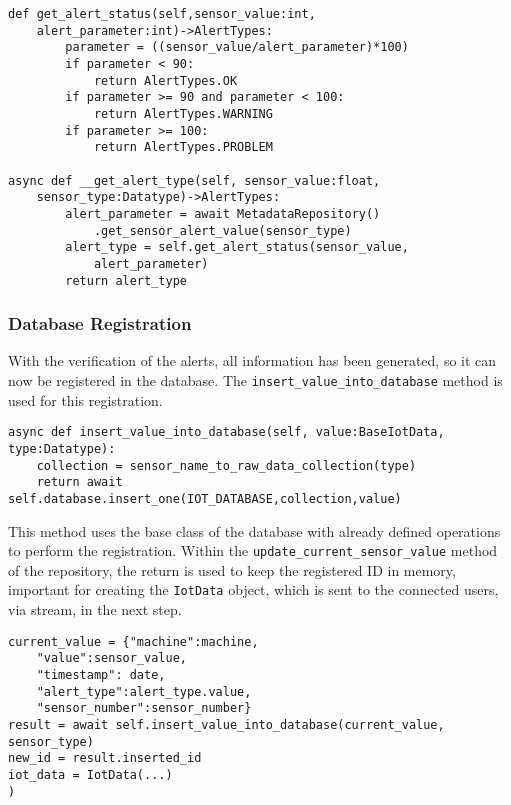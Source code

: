 \begin{Verbatim}[fontsize=\small, baselinestretch=0.8]
def get_alert_status(self,sensor_value:int,
    alert_parameter:int)->AlertTypes:
        parameter = ((sensor_value/alert_parameter)*100)
        if parameter < 90:
            return AlertTypes.OK
        if parameter >= 90 and parameter < 100:
            return AlertTypes.WARNING
        if parameter >= 100:
            return AlertTypes.PROBLEM

async def __get_alert_type(self, sensor_value:float,
    sensor_type:Datatype)->AlertTypes:
        alert_parameter = await MetadataRepository()
            .get_sensor_alert_value(sensor_type)
        alert_type = self.get_alert_status(sensor_value,
            alert_parameter)
        return alert_type
\end{Verbatim}

\subsubsection{Database Registration}

With the verification of the alerts, all information has been generated, so it can now be registered in the database. The \texttt{insert\_value\_into\_database} method is used for this registration.

\begin{Verbatim}[fontsize=\small, baselinestretch=0.8]
async def insert_value_into_database(self, value:BaseIotData, type:Datatype):
    collection = sensor_name_to_raw_data_collection(type)
    return await self.database.insert_one(IOT_DATABASE,collection,value)
\end{Verbatim}

This method uses the base class of the database with already defined operations to perform the registration. Within the \texttt{update\_current\_sensor\_value} method of the repository, the return is used to keep the registered ID in memory, important for creating the \texttt{IotData} object, which is sent to the connected users, via stream, in the next step.

\begin{Verbatim}[fontsize=\small, baselinestretch=0.8]
current_value = {"machine":machine,
    "value":sensor_value,
    "timestamp": date,
    "alert_type":alert_type.value,
    "sensor_number":sensor_number}
result = await self.insert_value_into_database(current_value, sensor_type)
new_id = result.inserted_id
iot_data = IotData(...)
)
\end{Verbatim}

